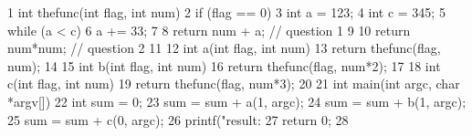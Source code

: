      1	int thefunc(int flag, int num) {
     2	  if (flag == 0) {
     3	    int a = 123;
     4	    int c = 345;
     5	    while (a < c) {
     6	      a += 33;
     7	    }
     8	    return num + a; // question 1
     9	  }
    10	  return num*num; // question 2
    11	}
    12	int a(int flag, int num) {
    13	  return thefunc(flag, num);
    14	}
    15	int b(int flag, int num) {
    16	  return thefunc(flag, num*2);
    17	}
    18	int c(int flag, int num) {
    19	  return thefunc(flag, num*3);
    20	}
    21	int main(int argc, char *argv[]) {
    22	  int sum = 0;
    23	  sum = sum + a(1, argc);
    24	  sum = sum + b(1, argc);
    25	  sum = sum + c(0, argc);
    26	  printf("result: %
    27	  return 0;
    28	}
